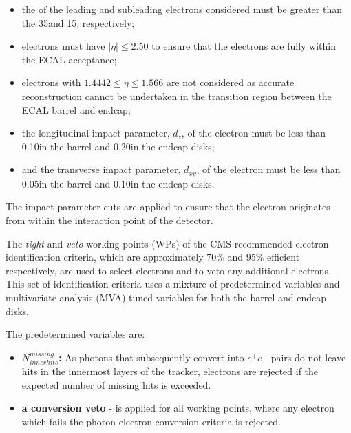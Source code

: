 \begin{itemize}
\item the \pt of the leading and subleading electrons considered must be greater than the 35\GeVc and 15\GeVc, respectively;
\item electrons must have $|\eta| \leq 2.50$ to ensure that the electrons are fully within the ECAL acceptance;
\item electrons with $1.4442 \leq \eta \leq 1.566$ are not considered as  accurate reconstruction cannot be undertaken in the transition region between the ECAL barrel and endcap;
\item the longitudinal impact parameter, $d_{z}$, of the electron must be less than 0.10\cm in the barrel and 0.20\cm in the endcap disks;
\item and the transverse impact parameter, $d_{xy}$, of the electron must be less than 0.05\cm in the barrel and 0.10\cm in the endcap disks.
\end{itemize}

The impact parameter cuts are applied to ensure that the electron originates from within the interaction point of the detector.

The \emph{tight} and \emph{veto} working points (WPs) of the CMS recommended electron identification criteria, which are approximately  70\% and 95\% efficient respectively, are used to select electrons and to veto any additional electrons.
This set of identification criteria uses a mixture of predetermined variables and multivariate analysis (MVA) tuned variables for both the barrel and endcap disks.

The predetermined variables are:
\begin{itemize}
\item \textbf{$N^{missing}_{inner hits}$:} As photons that subsequently convert into $e^{+} e^{-}$ pairs do not leave hits in the innermost layers of the tracker, electrons are rejected if the expected number of missing hits is exceeded.
\item \textbf{a conversion veto} - is applied for all working points, where any electron which fails the photon-electron conversion criteria is rejected.
\end{itemize}

